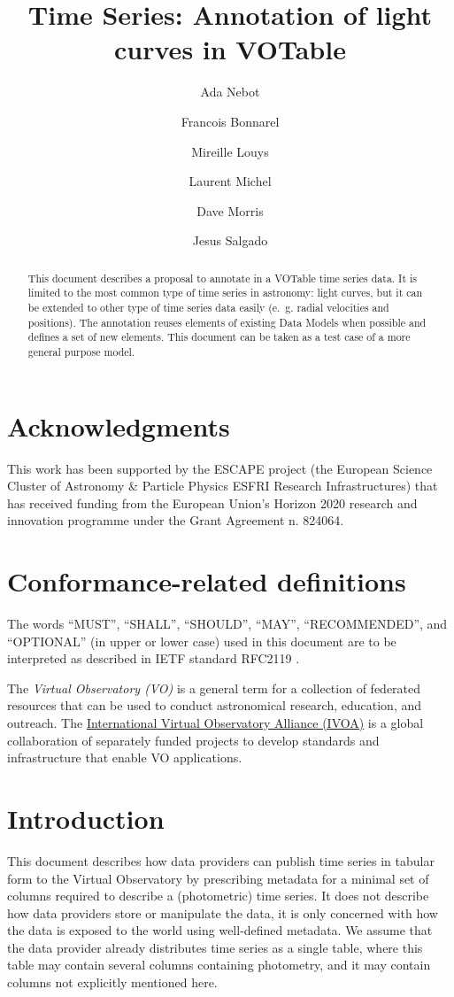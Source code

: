 \documentclass[11pt,a4paper]{ivoa}
\title{Time Series: Annotation of light curves in VOTable}
\author[http://www.ivoa.net/twiki/bin/view/IVOA/AdaNebot]{Ada Nebot}
\author[http://www.ivoa.net/twiki/bin/view/IVOA/FrancoisBonnarel]{Francois Bonnarel}
\author[http://www.ivoa.net/twiki/bin/view/IVOA/MireilleLouys]{Mireille Louys}
\author[http://www.ivoa.net/twiki/bin/view/IVOA/LaurentMichel]{Laurent Michel}
\author[http://www.ivoa.net/twiki/bin/view/IVOA/DaveMorris]{Dave Morris}
\author[http://www.ivoa.net/twiki/bin/view/IVOA/JesusSalgado]{Jesus Salgado}
\begin{document}
\begin{abstract}
  This document describes a proposal to annotate in a VOTable time series data. It is limited to the most common type of time series in astronomy: light curves, but it can be extended to other type of time series data easily (e.~g. radial velocities and positions). The annotation reuses elements of existing Data Models when possible and defines a set of new elements. This document can be taken as a test case of a more general purpose model. 
\end{abstract}

\section*{Acknowledgments}
This work has been supported by the ESCAPE project (the European Science Cluster of Astronomy \& Particle Physics ESFRI Research Infrastructures) that has received funding from the European Union’s Horizon 2020 research and innovation programme under the Grant Agreement n. 824064.

\section*{Conformance-related definitions}

The words ``MUST'', ``SHALL'', ``SHOULD'', ``MAY'', ``RECOMMENDED'', and
``OPTIONAL'' (in upper or lower case) used in this document are to be
interpreted as described in IETF standard RFC2119 \citet{std:RFC2119}.

The \emph{Virtual Observatory (VO)} is a
general term for a collection of federated resources that can be used
to conduct astronomical research, education, and outreach.
The \href{http://www.ivoa.net}{International
Virtual Observatory Alliance (IVOA)} is a global
collaboration of separately funded projects to develop standards and
infrastructure that enable VO applications.


\section{Introduction}
This document describes how data providers can publish time series in tabular form to the Virtual Observatory by prescribing metadata for a minimal set of columns required to describe a (photometric) time series.  It does not describe how data providers store or manipulate the data, it is only concerned with how the data is exposed to the world using well-defined metadata. We assume that the data provider already distributes time series as a single table, where this table may contain several columns containing photometry, and it may contain columns not explicitly mentioned here. 
\end{document}
